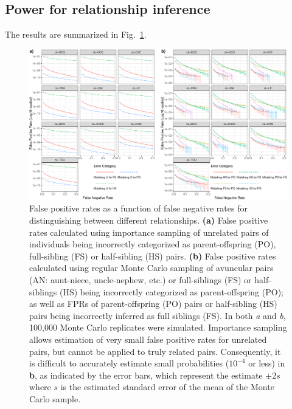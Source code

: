 \subsection*{Power for relationship inference}

The results are summarized in Fig.~\ref{fig:fprs}.
\begin{figure}
\newcommand{\fprcap}{\footnotesize False positive rates as a function of false negative
rates for distinguishing between different relationships.  {\bf (a)} False positive rates calculated
using importance sampling of unrelated pairs of individuals being incorrectly categorized as parent-offspring (PO),
full-sibling (FS) or half-sibling (HS) pairs.  {\bf (b)}  False positive rates calculated using regular Monte Carlo
sampling of avuncular pairs (AN: aunt-niece, uncle-nephew, etc.) or full-siblings (FS) or half-siblings (HS) being 
incorrectly categorized as parent-offspring (PO); as well as FPRs of parent-offspring (PO) pairs or half-sibling (HS) 
pairs being incorrectly inferred as full siblings (FS).  In both {\em a} and {\em b}, 100,000 Monte Carlo replicates 
were simulated.  Importance sampling allows estimation of very small false positive rates for unrelated pairs, but 
cannot be applied to truly related pairs.  Consequently, it is difficult to accurately estimate small probabilities 
($10^{-4}$ or less) in {\bf b}, as indicated by the error bars, which represent the estimate $\pm 2s$ where $s$ is the estimated standard error of the mean of the Monte Carlo sample.  }
\begin{center}
\includegraphics[width=\textwidth]{images/fpr-fnr-figure-crop.pdf}
\end{center}
\caption[\fprcap]{\fprcap}
\label{fig:fprs}
\end{figure}





